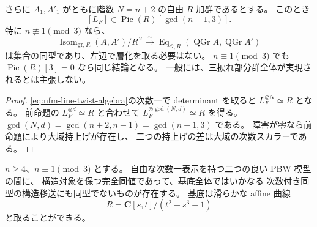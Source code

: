 \begin{corollary}[自由な表示模型における三捩れの障害]
\label{cor:nfm-three-torsion-lift}
さらに $A_1,A'_1$ がともに階数 $N=n+2$ の自由 $R$-加群であるとする。
このとき
\[
 [L_F]\in\operatorname{Pic}(R)[\gcd(n-1,3)].
\]
特に $n\not\equiv1\pmod3$ なら、
\[
 \operatorname{Isom}_{\mathrm{gr},R}(A,A')/R^\times
 \xrightarrow{\sim}
 \operatorname{Eq}_{\mathcal O,R}
       (\operatorname{QGr}A,\operatorname{QGr}A')
\]
は集合の同型であり、左辺で層化を取る必要はない。
$n\equiv1\pmod3$ でも $\operatorname{Pic}(R)[3]=0$ なら同じ結論となる。
一般には、三捩れ部分群全体が実現されるとは主張しない。
\end{corollary}

\begin{proof}
\eqref{eq:nfm-line-twist-algebra}の次数一で determinant を取ると
$L_F^{\otimes N}\simeq R$ となる。
前命題の $L_F^{\otimes d}\simeq R$ と合わせて
$L_F^{\otimes\gcd(N,d)}\simeq R$ を得る。
$\gcd(N,d)=\gcd(n+2,n-1)=\gcd(n-1,3)$ である。
障害が零なら前命題により大域持上げが存在し、
二つの持上げの差は大域の次数スカラーである。
\end{proof}

\begin{proposition}
\label{prop:nfm-nontrivial-three-torsion}
$n\ge4$、$n\equiv1\pmod3$ とする。
自由な次数一表示を持つ二つの良い PBW 模型の間に、
構造対象を保つ完全同値であって、基底全体ではいかなる
次数付き同型の構造移送にも同型でないものが存在する。
基底は滑らかな affine 曲線
\[
 R=\mathbf C[s,t]/(t^2-s^3-1)
\]
と取ることができる。
\end{proposition}

